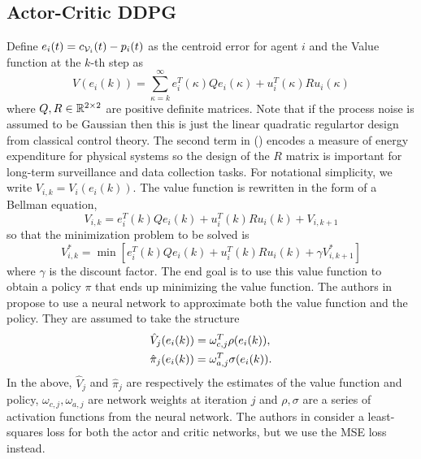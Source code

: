 \documentclass[10pt,conference]{IEEEtran}
\begin{document}
	\subsection{Actor-Critic DDPG}
	Define $e_i(t) = c_{\mathcal{V}_i}(t) - p_i(t)$ as the centroid error for agent $i$ and the Value function at the $k$-th step as
	\begin{equation}
		\label{value function}
		\displaystyle V(e_i(k)) = \sum\limits_{\kappa=k}^{\infty}{e_i^T(\kappa)Qe_i(\kappa) + u_i^T(\kappa)Ru_i(\kappa)}
	\end{equation}
	where $Q, R \in \mathbb{R}^{2\times 2}$ are positive definite matrices. Note that if the process noise is assumed to be Gaussian then this is just the linear quadratic regulartor design from classical control theory. The second term in () encodes a measure of energy expenditure for physical systems so the design of the $R$ matrix is important for long-term surveillance and data collection tasks. For notational simplicity, we write $V_{i,k} = V_i(e_i(k))$. The value function is rewritten in the form of a Bellman equation, 
	\begin{equation}
		\displaystyle V_{i,k} = e_i^T(k)Qe_i(k) + u_i^T(k)Ru_i(k) + V_{i,k+1}
	\end{equation}
	so that the minimization problem to be solved is 
	\begin{equation*}
		\displaystyle V_{i,k}^* = \min\limits_{}{\left[ e_i^T(k)Qe_i(k) + u_i^T(k)Ru_i(k) + \gamma V_{i,k+1}^*\right]}
	\end{equation*}
	where $\gamma$ is the discount factor. The end goal is to use this value function to obtain a policy $\pi$ that ends up minimizing the value function. The authors in \cite{FLAIRS1612802} propose to use a neural network to approximate both the value function and the policy. They are assumed to take the structure 
	\begin{align}
		\displaystyle &\hat{V}_j(e_i(k)) = \omega_{c,j}^T \rho(e_i(k)), \\
		&\hat{\pi}_j(e_i(k)) = \omega_{a,j}^T\sigma(e_i(k)).
	\end{align}
	In the above, $\hat{V}_j$ and $\hat{\pi}_j$ are respectively the estimates of the value function and policy, $\omega_{c,j}, \omega_{a,j}$ are network weights at iteration $j$ and $\rho, \sigma$ are a series of activation functions from the neural network. The authors in \cite{FLAIRS1612802} consider a least-squares loss for both the actor and critic networks, but we use the MSE loss instead. 
	
\end{document}
